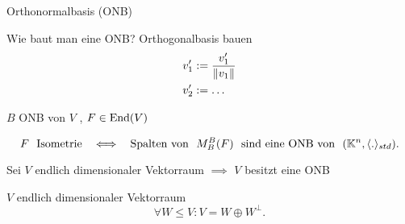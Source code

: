 \documentclass[class=article, crop=false]{standalone}
\begin{document}
\begin{zettel}{Orthonormalbasis (ONB)}
\begin{flashcard}[ewdixygd]{Wie baut man eine ONB?}
	Orthogonalbasis bauen
	\begin{align*}
		v_1' & := \frac{v_1'}{ \left\|v_1\right\|} \\
		v_2' & := \dots
	\end{align*}

\end{flashcard}
$B$ ONB von $V$ , $F \in  \operatorname{End}(V)$
\begin{theorem}
	\[
		F \tx{ Isometrie } \iff  \tx{ Spalten von } M_B^B (F) \tx{ sind eine ONB von } (\mathbb{K}^n, \langle .\rangle_{std})
	.\]
\end{theorem}

\begin{corollary}
	Sei $V$ endlich dimensionaler Vektorraum $\implies $ $V$ besitzt eine ONB
\end{corollary}

\begin{corollary}
	$V$ endlich dimensionaler Vektorraum
	\[
		\forall W \leq  V : V = W \oplus W^{\perp}
	.\]
\end{corollary}

\end{zettel}
\end{document}
